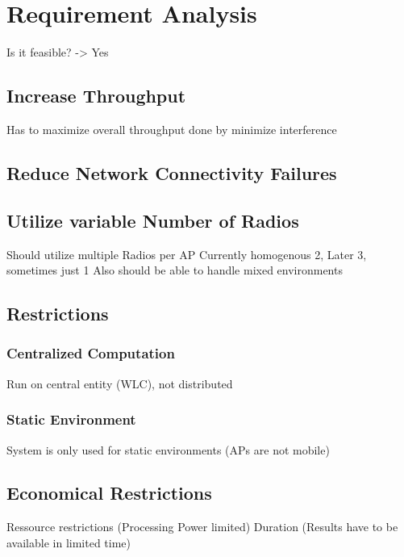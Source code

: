 \chapter{Requirement Analysis}
Is it feasible? -> Yes
\section{Increase Throughput}
  Has to maximize overall throughput\newline
    done by minimize interference\newline
\section{Reduce Network Connectivity Failures}
\section{Utilize variable Number of Radios}
  Should utilize multiple Radios per AP\newline
  Currently homogenous 2, Later 3, sometimes just 1 \newline
  Also should be able to handle mixed environments \newline
\section{Restrictions}
  \subsection{Centralized Computation}
    Run on central entity (WLC), not distributed \newline 
  \subsection{Static Environment}
    System is only used for static environments (APs are not mobile) \newline
\section{Economical Restrictions}
  Ressource restrictions (Processing Power limited) \newline
  Duration (Results have to be available in limited time) \newline
